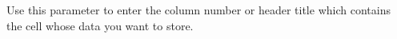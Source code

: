 
Use this parameter to enter the column number or header title which contains the cell whose data you want to store.

